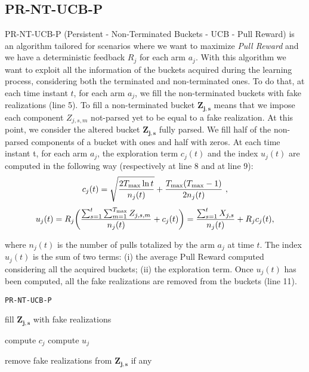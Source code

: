 \subsection{PR-NT-UCB-P}
PR-NT-UCB-P (Persistent - Non-Terminated Buckets - UCB - Pull Reward) is an algorithm tailored for scenarios where we want to maximize \emph{Pull Reward} and we have a deterministic feedback $R_j$ for each arm $a_j$. With this algorithm we want to exploit all the information of the buckets acquired during the learning process, considering both the terminated and non-terminated ones. 
To do that, at each time instant $t$, for each arm $a_j$, we fill the non-terminated buckets with fake realizations (line 5). To fill a non-terminated bucket $\boldsymbol{Z_{j,s}}$ means that we impose each component $Z_{j,s,m}$ not-parsed yet to be equal to a fake realization. At this point, we consider the altered bucket $\boldsymbol{Z_{j,s}}$ fully parsed. We fill half of the non-parsed components of a bucket with ones and half with zeros. At each time instant t, for each arm $a_j$, the exploration term $c_j(t)$ and the index $u_j(t)$ are computed in the following way (respectively at line 8 and at line 9):
$$c_j(t) =  \sqrt{\frac{2\Tmax\ln{t}}{n_j(t)}} + \frac{\Tmax(\Tmax-1)}{2n_j(t)} \ ,$$ 
$$
u_j(t) = R_j \bigg( \frac{\sum_{s=1}^{t}\sum_{m=1}^{T_{\textnormal{max}}}Z_{j,s,m}}{n_j(t)}+c_j(t) \bigg)  = \frac{\sum_{s=1}^{t} X_{j,s}}{n_j(t)} + R_jc_j(t)  ,
$$

where $n_j(t)$ is the number of pulls totalized by the arm $a_j$ at time $t$. The index $u_j(t)$ is the sum of two terms: (i) the average Pull Reward computed considering all the acquired buckets; (ii) the exploration term. Once $u_j(t)$ has been computed, all the fake realizations are removed from the buckets (line 11).

\begin{algorithm}[H]
	\caption{\texttt{PR-NT-UCB-P}}
	\begin{scriptsize}
		\begin{algorithmic}[1]
			
			
			
			
			\State fill $\boldsymbol{Z_{j,s}}$ with fake realizations
			\EndIf
			
			\EndFor		
			\State compute $c_j$\;
			\State compute $u_j$\;
			
			\State remove fake realizations from $\boldsymbol{Z_{j,s}}$ if any			
			\EndFor
			
	
							
			\EndFor
			
					
			\EndFunction
			
		\end{algorithmic}
	\end{scriptsize}
	\label{alg:Idea2}
\end{algorithm}

